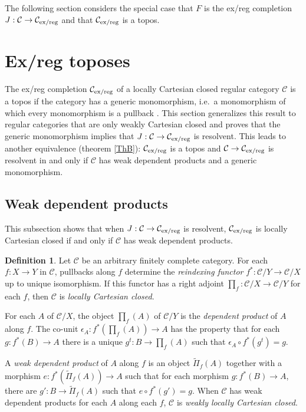 \documentclass[sort&compress]{elsarticle}
\theoremstyle{plain}
\theoremstyle{definition}
\newtheorem{defin}[theorem]{Definition}
\theoremstyle{remark}
\newcommand\cat\mathcal
\begin{document}
The following section considers the special case that $F$ is the ex/reg completion $J:\cat C\to\cat C\exreg$ and that $\cat C\exreg$ is a topos.

\section{Ex/reg toposes}
The ex/reg completion $\cat C\exreg$ of a locally Cartesian closed regular category $\cat C$ is a topos if the category has a generic monomorphism, i.e.\ a monomorphism of which every monomorphism is a pullback \citep{Menni00exactcompletions}. This section generalizes this result to regular categories that are only weakly Cartesian closed and proves that the generic monomorphism implies that $J:\cat C\to\cat C\exreg$ is resolvent. This leads to another equivalence (theorem \ref{ThB}): $\cat C\exreg$ is a topos and $\cat C \to \cat C\exreg$ is resolvent in and only if $\cat C$ has weak dependent products and a generic monomorphism.

\subsection{Weak dependent products}
This subsection shows that when $J:\cat C \to \cat C\exreg$ is resolvent, $\cat C\exreg$ is locally Cartesian closed if and only if $\cat C$ has weak dependent products.

\newcommand\weakprod{\widetilde{\Pi}}
\begin{defin} Let $\cat C$ be an arbitrary finitely complete category. For each $f:X\to Y$ in $\cat C$, pullbacks along $f$ determine the \emph{reindexing functor} $f^*:\cat C/Y\to\cat C/X$ up to unique isomorphism. If this functor has a right adjoint $\prod_f:\cat C/X\to\cat C/Y$ for each $f$, then $\cat C$ is \emph{locally Cartesian closed}. 

For each $A$ of $\cat C/X$, the object $\prod_f(A)$ of $\cat C/Y$ is the \emph{dependent product} of $A$ along $f$. The co-unit $\epsilon_A: f^*(\prod_f(A))\to A$ has the property that for each $g:f^*(B) \to A$ there is a unique $g^t:B\to \prod_f(A)$ such that $\epsilon_A\circ f^*(g^t) = g$.

A \emph{weak dependent product} of $A$ along $f$ is an object $\weakprod_f(A)$ together with a morphism $e:f^*(\weakprod_f(A))\to A$ such that for each morphism $g:f^*(B)\to A$, there are $g':B\to \weakprod_f(A)$ such that $e\circ f^*(g') = g$. When $\cat C$ has weak dependent products for each $A$ along each $f$, $\cat C$ is \emph{weakly locally Cartesian closed}.
\end{defin}
\end{document}
